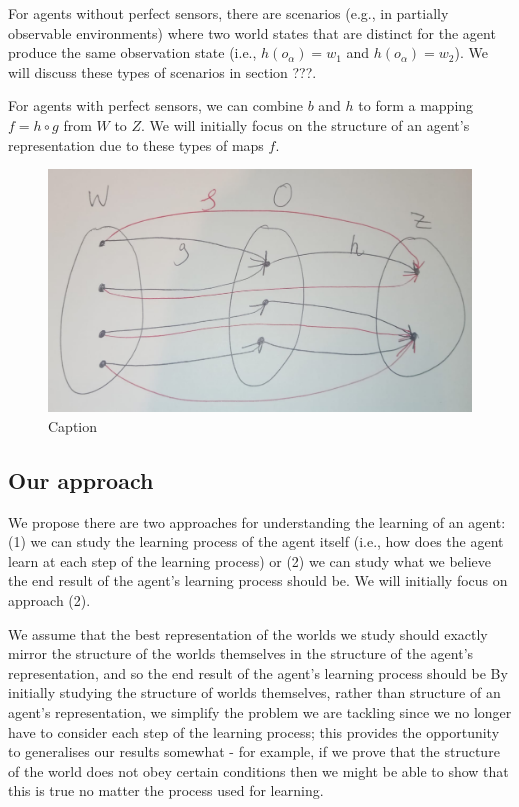 For agents without perfect sensors, there are scenarios (e.g., in partially observable environments) where two world states that are distinct for the agent produce the same observation state (i.e., $h(o_{\alpha}) = w_{1}$ and $h(o_{\alpha}) = w_{2}$).
We will discuss these types of scenarios in section ???.

For agents with perfect sensors, we can combine $b$ and $h$ to form a mapping $f = h \circ g$ from $W$ to $Z$.
We will initially focus on the structure of an agent's representation due to these types of maps $f$.
\begin{figure}
    \centering
    \includegraphics[width=0.5\linewidth]{2MathematicalFramework/InitialFramework/Images/W_to_Z.jpeg}
    \caption{Caption}
    \label{fig:W_to_Z}
\end{figure}


\subsection{Our approach}

We propose there are two approaches for understanding the learning of an agent: (1) we can study the learning process of the agent itself (i.e., how does the agent learn at each step of the learning process) or (2) we can study what we believe the end result of the agent's learning process should be.
We will initially focus on approach (2).

We assume that the best representation of the worlds we study should exactly mirror the structure of the worlds themselves in the structure of the agent's representation, and so the end result of the agent's learning process should be
By initially studying the structure of worlds themselves, rather than structure of an agent's representation, we simplify the problem we are tackling since we no longer have to consider each step of the learning process; this provides the opportunity to generalises our results somewhat - for example, if we prove that the structure of the world does not obey certain conditions then we might be able to show that this is true no matter the process used for learning.

